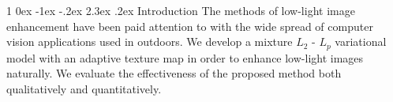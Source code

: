 \documentclass[a4paper,twocolumn,10pt]{article}
\makeatletter
\renewcommand{\section}{%
  \@startsection{section}%
   {1}%
   {\z@}%
   {0ex \@plus -1ex \@minus -.2ex}%
   {2.3ex \@plus.2ex}%
   {\normalfont\large\bfseries}%
}%
\makeatother
\begin{document}
\thispagestyle{empty}
%
\setlength{\baselineskip}{3mm}
%
\section{Introduction}
\thispagestyle{empty}
\vspace{-0.3cm}
The methods of low-light image enhancement have been paid attention to with the wide spread of computer vision applications used in outdoors. We develop a mixture $L_{2}$ - $L_{p}$ variational model with an adaptive texture map in order to enhance low-light images naturally. We evaluate the effectiveness of the proposed method both qualitatively and quantitatively.
\vspace{0.1cm}
\end{document}
